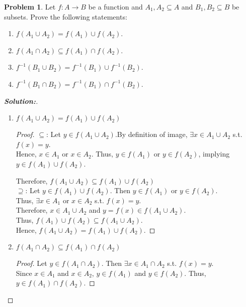\documentclass[12pt]{article}
\theoremstyle{definition}\newtheorem{problem}{Problem}
\newenvironment{solution}{\begin{proof}[\bfseries\textup{Solution:}]}{\end{proof}}
\begin{document}
\newpage
\begin{problem}
Let $f:A\to B$ be a function and $A_1,A_2\subseteq A$ and $B_1,B_2\subseteq B$ be subsets.  Prove the following statements:
\begin{enumerate}
\item $f(A_1\cup A_2) = f(A_1) \cup f(A_2)$.
\item $f(A_1\cap A_2) \subseteq f(A_1) \cap f(A_2)$.
\item $f^{-1}(B_1\cup B_2) = f^{-1}(B_1) \cup f^{-1}(B_2)$.
\item $f^{-1}(B_1\cap B_2) = f^{-1}(B_1) \cap f^{-1}(B_2)$.
\end{enumerate}
\end{problem}
\begin{solution}
    \begin{enumerate}
        \item \textbf{\( f(A_1 \cup A_2) = f(A_1) \cup f(A_2) \)}
        
        \begin{proof}
            \(\subseteq\): Let \( y \in f(A_1 \cup A_2) \).By definition of image, \(\exists x \in A_1 \cup A_2\) s.t. \( f(x) = y \). \\
            Hence, \( x \in A_1 \) or \( x \in A_2 \). Thus, \( y \in f(A_1) \) or \( y \in f(A_2) \), implying \( y \in f(A_1) \cup f(A_2) \).

            Therefore, $ f(A_1 \cup A_2) \subseteq f(A_1) \cup f(A_2)$ 
            \\

            \(\supseteq\): Let \( y \in f(A_1) \cup f(A_2) \). Then \( y \in f(A_1) \) or \( y \in f(A_2) \). \\
            Thus, \(\exists x \in A_1\) or \( x \in A_2 \) s.t. \( f(x) = y \). \\
            Therefore, \( x \in A_1 \cup A_2 \) and \( y = f(x) \in f(A_1 \cup A_2) \).\\
            Thus, \(f(A_1) \cup f(A_2) \subseteq f(A_1 \cup A_2)\).\\

            Hence, \( f(A_1 \cup A_2) = f(A_1) \cup f(A_2) \).
        \end{proof}
        \bigbreak
        
        \item \textbf{\( f(A_1 \cap A_2) \subseteq f(A_1) \cap f(A_2) \)}
        
        \begin{proof}
            Let \( y \in f(A_1 \cap A_2) \). Then \(\exists x \in A_1 \cap A_2\) s.t. \( f(x) = y \). \\
            Since \( x \in A_1 \) and \( x \in A_2 \), \( y \in f(A_1) \) and \( y \in f(A_2) \). Thus, \( y \in f(A_1) \cap f(A_2) \).
            

\end{proof}
\end{enumerate}
\end{solution}
\end{document}
